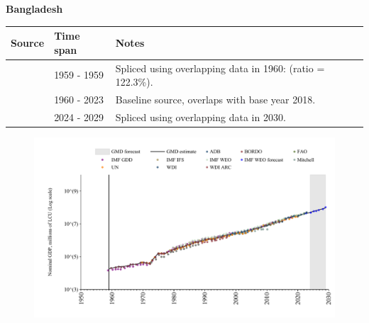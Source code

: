 \documentclass[12pt,a4paper,landscape]{article}
\begin{document}
\begin{adjustbox}{max totalsize={\paperwidth}{\paperheight},center}
\begin{minipage}[t][\textheight][t]{\textwidth}
\vspace*{0.5cm}
{}
\begin{center}
{\Large\bfseries Bangladesh}
\end{center}
\vspace{0.5cm}
\begin{table}[H]
\centering
\small
\begin{tabular}{|l|l|l|}
\hline
\textbf{Source} & \textbf{Time span} & \textbf{Notes} \\
\hline
\rowcolor{white}\cite{IMF_GDD}& 1959 - 1959 &Spliced using overlapping data in 1960: (ratio = 122.3\%).\\
\rowcolor{lightgray}\cite{WDI}& 1960 - 2023 &Baseline source, overlaps with base year 2018.\\
\rowcolor{white}\cite{IMF_WEO_forecast}& 2024 - 2029 &Spliced using overlapping data in 2030.\\
\hline
\end{tabular}
\end{table}
\begin{figure}[H]
\centering
\includegraphics[width=\textwidth,height=0.6\textheight,keepaspectratio]{graphs/BGD_nGDP.pdf}
\end{figure}
\end{minipage}
\end{adjustbox}
\end{document}

